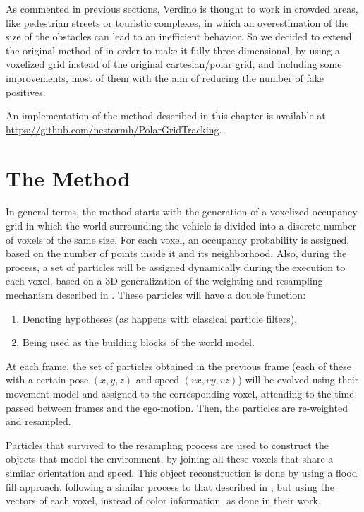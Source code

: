 As commented in previous sections, Verdino is thought to work in crowded areas, like pedestrian streets or touristic complexes, in which an overestimation of the size of the obstacles can lead to an inefficient behavior. So we decided to extend the original method of \cite{danescu2012particle} in order to make it fully three-dimensional, by using a voxelized grid instead of the original cartesian/polar grid, and including some improvements, most of them with the aim of reducing the number of fake positives.

An implementation of the method described in this chapter is available at \url{https://github.com/nestormh/PolarGridTracking}.

\section{The Method}\label{ch:chapter05_01}

In general terms, the method starts with the generation of a voxelized occupancy grid in which the world surrounding the vehicle is divided into a discrete number of voxels of the same size. For each voxel, an occupancy probability is assigned, based on the number of points inside it and its neighborhood. Also, during the process, a set of particles will be assigned dynamically during the execution to each voxel, based on a 3D generalization of the weighting and resampling mechanism described in \cite{isard1998condensation}. These particles will have a double function:
\begin{enumerate}
 \item Denoting hypotheses (as happens with classical particle filters).
 \item Being used as the building blocks of the world model.
\end{enumerate}

At each frame, the set of particles obtained in the previous frame (each of these with a certain pose ${(x, y, z)}$ and speed ${(vx, vy, vz)}$) will be evolved using their movement model and assigned to the corresponding voxel, attending to the time passed between frames and the ego-motion. Then, the particles are re-weighted and resampled.

Particles that survived to the resampling process are used to construct the objects that model the environment, by joining all these voxels that share a similar orientation and speed. This object reconstruction is done by using a flood fill approach, following a similar process to that described in \cite{broggi2013}, but using the vectors of each voxel, instead of color information, as done in their work.

